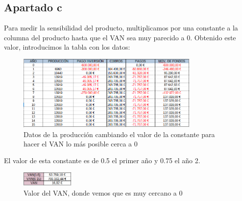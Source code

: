 \documentclass[11pt,letterpaper,onecolumn]{article}
\begin{document}
\subsection{Apartado c}
Para medir la sensibilidad del producto, multiplicamos por una constante a la columna del producto hasta que el VAN sea muy parecido a 0. Obtenido este valor, introducimos la tabla con los datos:
\begin{figure}[H]
	\centering
	\includegraphics[width=0.8\textwidth]{imagen/ej4c.PNG}
	\caption{Datos de la producción cambiando el valor de la constante para hacer el VAN lo más posible cerca a 0}
	\label{fig:imagen-ej4c-PNG}
\end{figure}
El valor de esta constante es de 0.5 el primer año y 0.75 el año 2.
\begin{figure}[H]
	\centering
	\includegraphics[width=0.23\textwidth]{imagen/ej4c_van.PNG}
	\caption{Valor del VAN, donde vemos que es muy cercano a 0}
	\label{fig:imagen-ej4c_van-PNG}
\end{figure}
\end{document}

